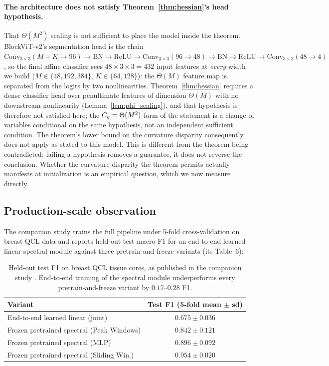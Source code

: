 \paragraph{The architecture does not satisfy Theorem~\ref{thm:hessian}'s
head hypothesis.}
That $\Theta(M^2)$ scaling is not sufficient to place the model inside
the theorem. BlockViT-v2's segmentation head is the chain
$\mathrm{Conv}_{3\times3}(M{+}K \to 96) \to \mathrm{BN} \to
\mathrm{ReLU} \to \mathrm{Conv}_{3\times3}(96 \to 48) \to \mathrm{BN}
\to \mathrm{ReLU} \to \mathrm{Conv}_{3\times3}(48 \to 4)$, so the final
affine classifier sees $48 \times 3 \times 3 = 432$ input features at
\emph{every} width we build ($M \in \{48,192,384\}$,
$K \in \{64,128\}$): the $\Theta(M)$ feature map is separated from the
logits by two nonlinearities. Theorem~\ref{thm:hessian} requires a
dense classifier head over penultimate features of dimension
$\Theta(M)$ with no downstream nonlinearity
(Lemma~\ref{lem:phi_scaling}), and that hypothesis is therefore not
satisfied here; the $C_g = \Theta(M^2)$ form of the statement is a
change of variables conditional on the same hypothesis, not an
independent sufficient condition. The theorem's lower bound on the
curvature disparity consequently does not apply as stated to this
model. This is different from the theorem being contradicted: failing a
hypothesis removes a guarantee, it does not reverse the conclusion.
Whether the curvature disparity the theorem permits actually manifests
at initialization is an empirical question, which we now measure
directly.

\subsection{Production-scale observation}
\label{sec:real_observation}

The companion study trains the full pipeline under 5-fold
cross-validation on breast QCL data and reports held-out test macro-F1
for an end-to-end learned linear spectral module against three
pretrain-and-freeze variants (its Table~6):

\begin{table}[h]
\centering
\begin{tabular}{lc}
\toprule
Variant & Test F1 (5-fold mean $\pm$ sd) \\
\midrule
End-to-end learned linear (joint)          & $0.675 \pm 0.036$ \\
Frozen pretrained spectral (Peak Windows)  & $0.842 \pm 0.121$ \\
Frozen pretrained spectral (MLP)           & $0.896 \pm 0.092$ \\
Frozen pretrained spectral (Sliding Win.)  & $0.954 \pm 0.020$ \\
\bottomrule
\end{tabular}
\caption{Held-out test F1 on breast QCL tissue cores, as published in
the companion study \citep{dziuba2026spatial}. End-to-end training of
the spectral module underperforms every pretrain-and-freeze variant by
$0.17$--$0.28$ F1.}
\label{tab:real}
\end{table}

